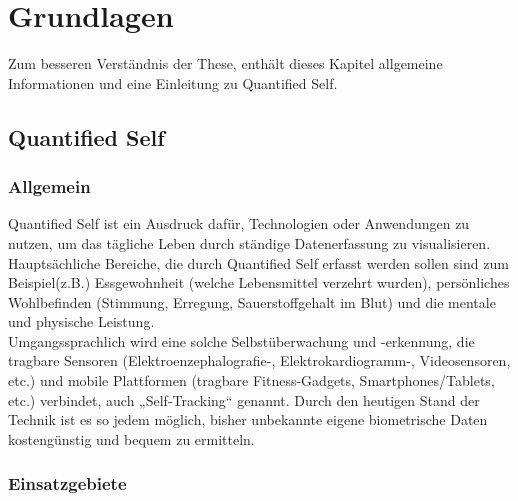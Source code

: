 
\chapter{Grundlagen}
\label{ch:Grundlagen}
Zum besseren Verständnis der These, enthält dieses Kapitel allgemeine Informationen und eine Einleitung zu Quantified Self.


\section{Quantified Self}
\label{ch:Grundlagen:sec:QuantifiedSelf}

\subsection{Allgemein}
\label{ch:Grundlagen:sec:QuantifiedSelf:subsec:Allgemein}

Quantified Self ist ein Ausdruck dafür, Technologien oder Anwendungen zu nutzen, um das tägliche Leben durch ständige Datenerfassung zu visualisieren. 
Hauptsächliche Bereiche, die durch Quantified Self erfasst werden sollen sind zum Beispiel(z.B.) Essgewohnheit (welche Lebensmittel verzehrt wurden), persönliches Wohlbefinden (Stimmung, Erregung, Sauerstoffgehalt im Blut) und die mentale und physische Leistung\cite{web:WhatIsQS}. \\
Umgangssprachlich wird eine solche Selbstüberwachung und -erkennung, die tragbare Sensoren (Elektroenzephalografie-, Elektrokardiogramm-, Videosensoren, etc.) und mobile Plattformen (tragbare Fitness-Gadgets, Smartphones/Tablets, etc.) verbindet, auch „Self-Tracking“ genannt. 
Durch den heutigen Stand der Technik ist es so jedem möglich, bisher unbekannte eigene biometrische Daten kostengünstig und bequem zu ermitteln.

\subsection{Einsatzgebiete}
\label{ch:Grundlagen:sec:QuantifiedSelf:subsec:Einsatzgebiete}

